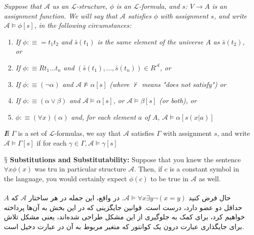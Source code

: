 \documentclass[10pt,a4paper]{article}
\newenvironment{callout}
	{\begin{calloutbox}\color{charcoal}\textbf\textit}
	{\end{calloutbox}}
\newcommand{\newpoint}[1]{\indent$\mathsection$ \textbf{#1}}
\newcommand{\curveL}{\mathcal{L}}
\newcommand{\curveA}{\mathcal{A}}
\begin{document}
                    \begin{define}
                        \textit{Suppose that $\curveA$ us an $\curveL$-structure, $\phi$ is an $\curveL$-formula, and $s$: $V\rightarrow A$ is an assignment function. We will say that $\curveA$ satisfies $\phi$ with assignment $s$, and write $\curveA\vDash \phi[s]$, in the following circumstances:}
                        \begin{enumerate}
                            \item \textit{If $\phi :\equiv =t_1t_2$ and $\bar s(t_1)$ is the same element of the universe $A$ as $\bar s(t_2)$, or}
                            \item \textit{If $\phi :\equiv Rt_1\dots t_n$ and $(\bar s(t_1),\dots,\bar s(t_n))\in R^\curveA$, or}
                            \item \textit{If $\phi:\equiv (\neg \alpha)$ and $\curveA \not\vDash \alpha[s]$ (where $\not\vdash$ means "does not satisfy") or}
                            \item \textit{If $\phi:\equiv (\alpha\lor\beta)$ and $\curveA\vDash\alpha[s]$, or $\curveA \vDash\beta[s]$ (or both), or}
                            \item \textit{$\phi:\equiv(\forall x)(\alpha)$ and, for each element $a$ of $A$, $\curveA\vDash \alpha[s(x|a)]$}
                        \end{enumerate}
                    \end{define}
                    \begin{callout}
                        If $\Gamma$ is a set of $\curveL$-formulas, we say that $\curveA$ satisfies $\Gamma$ with assignment $s$, and write $\curveA\vDash \Gamma[s]$ if for each $\gamma\in\Gamma, \curveA\vDash \gamma[s]$
                    \end{callout}
                    \newpoint{Substitutions and Substitutability:} Suppose that you knew the sentence $\forall x \phi(x)$ was tru in particular structure $\curveA$. Then, if $c$ is a constant symbol in the language, you would certainly expect $\phi(c)$ to be true in $\curveA$ as well.
                    \\
                    \\
                    حال فرض کنید $\curveA\vDash \forall x\exists y\neg(x=y)$. در واقع، این جمله در هر ساختار $\curveA$ که $A$ حداقل دو عضو دارد، درست است. قوانین جایگزینی که در این بخش به آن‌ها پرداخته خواهیم کرد، برای کمک به جلوگیری از این مشکل طراحی شده‌اند، یعنی مشکل تلاش برای جایگذاری عبارت درون یک کوانتور که متغیر مربوط به آن در عبارت دخیل است.
\end{document}
